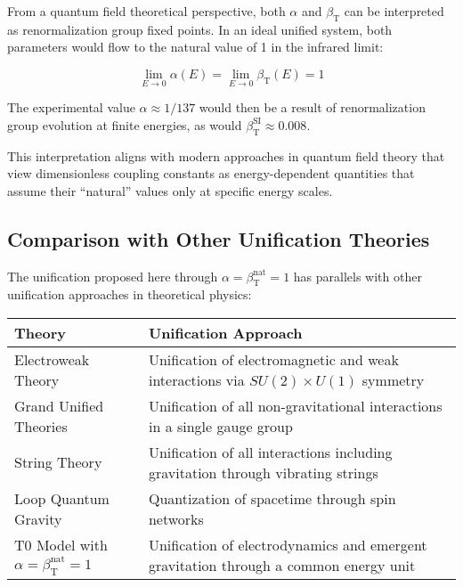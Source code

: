 \documentclass[12pt,a4paper]{article}
\newcommand{\betaT}{\beta_{\text{T}}}
\begin{document}
	From a quantum field theoretical perspective, both \(\alpha\) and \(\betaT\) can be interpreted as renormalization group fixed points. In an ideal unified system, both parameters would flow to the natural value of 1 in the infrared limit:
	
	\begin{equation}
		\lim_{E \to 0} \alpha(E) = \lim_{E \to 0} \betaT(E) = 1
	\end{equation}
	
	The experimental value \(\alpha \approx 1/137\) would then be a result of renormalization group evolution at finite energies, as would \(\betaT^{\text{SI}} \approx 0.008\).
	
	This interpretation aligns with modern approaches in quantum field theory that view dimensionless coupling constants as energy-dependent quantities that assume their “natural” values only at specific energy scales.
	
	\subsection{Comparison with Other Unification Theories}
	
	The unification proposed here through \(\alpha = \betaT^{\text{nat}} = 1\) has parallels with other unification approaches in theoretical physics:
	
	\begin{tcolorbox}[colback=blue!5!white,colframe=blue!75!black,title=Comparison with Other Unification Theories]
		\begin{tabular}{>{\raggedright\arraybackslash}p{3cm}|>{\raggedright\arraybackslash}p{8cm}}
			\textbf{Theory} & \textbf{Unification Approach} \\
			\hline
			Electroweak Theory & Unification of electromagnetic and weak interactions via \(SU(2) \times U(1)\) symmetry \\
			\hline
			Grand Unified Theories & Unification of all non-gravitational interactions in a single gauge group \\
			\hline
			String Theory & Unification of all interactions including gravitation through vibrating strings \\
			\hline
			Loop Quantum Gravity & Quantization of spacetime through spin networks \\
			\hline
			T0 Model with \(\alpha = \betaT^{\text{nat}} = 1\) & Unification of electrodynamics and emergent gravitation through a common energy unit \\
		\end{tabular}
	\end{tcolorbox}
	
\end{document}
